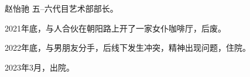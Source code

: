 \begin{personSection}{赵怡驰}
	五--六代目艺术部部长。

	2021年底，与人合伙在朝阳路上开了一家女仆咖啡厅，后废。

	2022年底，与男朋友分手，后线下发生冲突，精神出现问题，住院。

	2023年3月，出院。
\end{personSection}